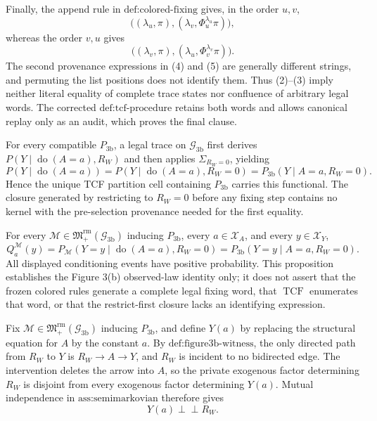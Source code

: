Finally, the append rule in \(\text{def:colored-fixing}\) gives, in the order \(u,v\),
\[
\bigl((\lambda_u,\pi),(\lambda_v,\Phi_u^{\lambda_u}\pi)\bigr),
\tag{4}
\]
whereas the order \(v,u\) gives
\[
\bigl((\lambda_v,\pi),(\lambda_u,\Phi_v^{\lambda_v}\pi)\bigr).
\tag{5}
\]
The second provenance expressions in (4) and (5) are generally different strings, and permuting the list positions does not identify them. Thus (2)--(3) imply neither literal equality of complete trace states nor confluence of arbitrary legal words. The corrected \(\text{def:tcf-procedure}\) retains both words and allows canonical replay only as an audit, which proves the final clause.

For every compatible \(P_{\mathrm{3b}}\), a legal trace on \(\mathcal G_{\mathrm{3b}}\) first derives \(P(Y\mid\operatorname{do}(A=a),R_W)\) and then applies \(\Sigma_{R_W=0}\), yielding \[P(Y\mid\operatorname{do}(A=a))=P(Y\mid\operatorname{do}(A=a),R_W=0)=P_{\mathrm{3b}}(Y\mid A=a,R_W=0).\] Hence the unique TCF partition cell containing \(P_{\mathrm{3b}}\) carries this functional. The closure generated by restricting to \(R_W=0\) before any fixing step contains no kernel with the pre-selection provenance needed for the first equality.

For every \(\mathcal M\in\mathfrak M_{+}^{\mathrm{rm}}(\mathcal G_{\mathrm{3b}})\) inducing \(P_{\mathrm{3b}}\), every \(a\in\mathcal X_A\), and every \(y\in\mathcal X_Y\),
\[
Q_a^{\mathcal M}(y)
=P_{\mathcal M}(Y=y\mid\operatorname{do}(A=a),R_W=0)
=P_{\mathrm{3b}}(Y=y\mid A=a,R_W=0).
\]
All displayed conditioning events have positive probability. This proposition establishes the Figure 3(b) observed-law identity only; it does not assert that the frozen colored rules generate a complete legal fixing word, that \(\operatorname{TCF}\) enumerates that word, or that the restrict-first closure lacks an identifying expression.

Fix \(\mathcal M\in\mathfrak M_{+}^{\mathrm{rm}}(\mathcal G_{\mathrm{3b}})\) inducing \(P_{\mathrm{3b}}\), and define \(Y(a)\) by replacing the structural equation for \(A\) by the constant \(a\). By \(\text{def:figure3b-witness}\), the only directed path from \(R_W\) to \(Y\) is \(R_W\to A\to Y\), and \(R_W\) is incident to no bidirected edge. The intervention deletes the arrow into \(A\), so the private exogenous factor determining \(R_W\) is disjoint from every exogenous factor determining \(Y(a)\). Mutual independence in \(\text{ass:semimarkovian}\) therefore gives
\[
Y(a)\mathbin{\perp\!\!\!\perp}R_W.
\tag{1}
\]

